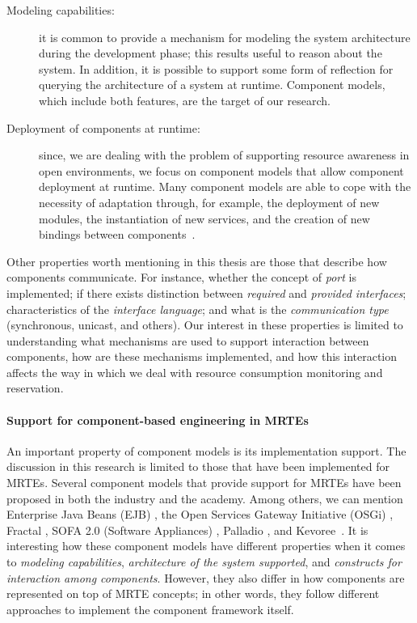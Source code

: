 \begin{description}
\item[Modeling capabilities:] it is common to provide a mechanism for modeling the system architecture during the development phase; this results useful to reason about the system.
In addition, it is possible to support some form of reflection for querying the architecture of a system at runtime.
Component models, which include both features, are the target of our research.

\item[Deployment of components at runtime:] since, we are dealing with the problem of supporting resource awareness in open environments, we focus on component models that allow component deployment at runtime.
Many component models are able to cope with the necessity of adaptation through, for example, the deployment of new modules, the instantiation of new services, and the creation of new bindings between components~\cite{Porter:2014:RMC:2602458.2602471, Zheng:2014:RCC:2679601.2680405, Irmert:2008:RAS:1370018.1370036, Ghezzi:2010:QDD:2163764.2163774}.
\end{description}

Other properties worth mentioning in this thesis are those that describe how components communicate.
For instance,  whether the concept of \textit{port} is implemented; if there exists distinction between \textit{required} and \textit{provided interfaces}; characteristics of the \textit{interface language}; and what is the \textit{communication type} (synchronous, unicast, and others).
Our interest in these properties is limited to understanding what mechanisms are used to support interaction between components, how are these mechanisms implemented, and how this interaction affects the way in which we deal with resource consumption monitoring and reservation.

\paragraph{Support for component-based engineering in MRTEs}
An important property of component models is its implementation support.
The discussion in this research is limited to those that have been implemented for MRTEs.
Several component models that provide support for MRTEs have been proposed in both the industry and the academy.
Among others, we can mention Enterprise Java Beans (EJB) \cite{OracleEJB3.0}, the Open Services Gateway Initiative (OSGi) \cite{OSGI:r5}, 
Fractal \cite{Bruneton:2006:FCM:1152333.1152345}, 
SOFA 2.0 (Software Appliances) \cite{Bures2006}, Palladio \cite{Becker:2010:PCM:1712605.1712651}, and Kevoree~\cite{morin09a,leger2010reliable}.
It is interesting how these component models have different properties when it comes to \textit{modeling capabilities}, \textit{architecture of the system supported}, and \textit{constructs for interaction among components}.
However, they also differ in how components are represented on top of MRTE concepts; in other words, they follow different approaches to implement the component framework itself.

